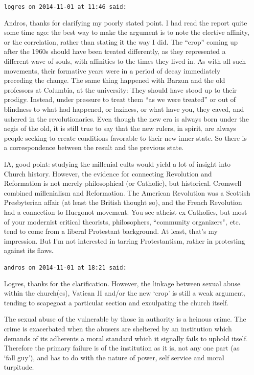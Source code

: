 \begin{footnotesize}
\begin{sffamily}
\hfill

\texttt{logres on 2014-11-01 at 11:46 said:}

Andros, thanks for clarifying my poorly stated point. I had read the report quite some time ago: the best way to make the argument is to note the elective affinity, or the correlation, rather than stating it the way I did. The ``crop'' coming up after the 1960s should have been treated differently, as they represented a different wave of souls, with affinities to the times they lived in. As with all such movements, their formative years were in a period of decay immediately preceding the change. The same thing happened with Barzun and the old professors at Columbia, at the university: They should have stood up to their prodigy. Instead, under pressure to treat them ``as we were treated'' or out of blindness to what had happened, or laziness, or what have you, they caved, and ushered in the revolutionaries. Even though the new era is always born under the aegis of the old, it is still true to say that the new rulers, in spirit, are always people seeking to create conditions favorable to their new inner state. So there is a correspondence between the result and the previous state.

IA, good point: studying the millenial cults would yield a lot of insight into Church history. However, the evidence for connecting Revolution and Reformation is not merely philosophical (or Catholic), but historical. Cromwell combined millenialism and Reformation. The American Revolution was a Scottish Presbyterian affair (at least the British thought so), and the French Revolution had a connection to Huegonot movement. You see atheist ex-Catholics, but most of your modernist critical theorists, philosophers, ``community organizers'', etc. tend to come from a liberal Protestant background. At least, that's my impression. But I'm not interested in tarring Protestantism, rather in protesting against its flaws.

\hfill

\texttt{andros on 2014-11-01 at 18:21 said:}

Logres, thanks for the clarification. However, the linkage between sexual abuse within the church(es), Vatican II and/or the new `crop' is still a weak argument, tending to scapegoat a particular section and exculpating the church itself.

The sexual abuse of the vulnerable by those in authority is a heinous crime. The crime is exacerbated when the abusers are sheltered by an institution which demands of its adherents a moral standard which it signally fails to uphold itself. Therefore the primary failure is of the institution as it is, not any one part (as `fall guy'), and has to do with the nature of power, self service and moral turpitude.


\end{sffamily}
\end{footnotesize}
